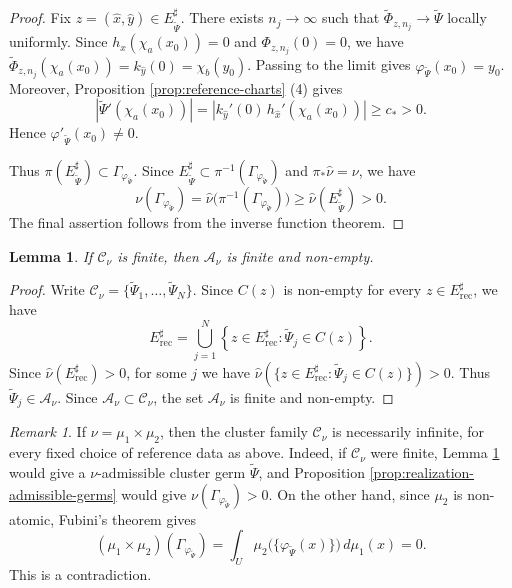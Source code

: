 \documentclass[11pt]{amsart}
\numberwithin{equation}{section}
\theoremstyle{plain}
\newtheorem{lem}[thm]{Lemma}
\theoremstyle{definition}
\theoremstyle{remark}
\newtheorem{rmk}[thm]{Remark}
\begin{document}
\begin{proof}
Fix
$z=(\hat x,\hat y)\in E^\sharp_{\widetilde\Psi}$.
There exists $n_j\to\infty$ such that
$
\widetilde\Phi_{z,n_j}
\to
\widetilde\Psi
$
locally uniformly.
Since
$h_{\hat x}(
\chi_a
(x_0))=0$
and
$\Phi_{z,n_j}(0)=0$, we have
$
\widetilde\Phi_{z,n_j}(
\chi_a(x_0))
=
k_{\hat y}(0)
=
\chi_b(y_0)$.
Passing to the limit gives
$
\varphi_{\widetilde\Psi}(x_0)=y_0$.
Moreover, Proposition \ref{prop:reference-charts} (4) gives
$$
\left|
\widetilde\Psi'(
\chi_a
(x_0))
\right|
=
\left|
k_{\hat y}'(0)\,
h_{\hat x}'(
\chi_a(x_0))
\right|
\geq c_*>0.
$$
Hence
$\varphi'_{\widetilde\Psi}(x_0)\neq0$.

Thus
$\pi(E^\sharp_{\widetilde\Psi})
\subset\Gamma_{\varphi_{\widetilde\Psi}}$.
Since
$E^\sharp_{\widetilde\Psi}
\subset
\pi^{-1}(\Gamma_{\varphi_{\widetilde\Psi}})$
and $\pi_*\hat\nu=\nu$, we have
$$
\nu(\Gamma_{\varphi_{\widetilde\Psi}})
=
\hat\nu\bigl(
\pi^{-1}(\Gamma_{\varphi_{\widetilde\Psi}})
\bigr)
\geq
\hat\nu(E^\sharp_{\widetilde\Psi})
>0.
$$
The final assertion follows from the inverse function theorem.
\end{proof}

\begin{lem}\label{lem:Cnu-finite-admissible}
If $\mathcal C_\nu$ is finite, then
$\mathcal A_\nu$ is finite and non-empty.
\end{lem}

\begin{proof}
Write
$
\mathcal C_\nu
=
\{
\widetilde\Psi_1,\ldots,\widetilde\Psi_N
\}.
$
Since $C(z)$ is non-empty for every
$z\in E^\sharp_{\mathrm{rec}}$, we have
$$
E^\sharp_{\mathrm{rec}}
=
\bigcup_{j=1}^N
\left\{
z\in E^\sharp_{\mathrm{rec}}:
\widetilde\Psi_j\in C(z)
\right\}.
$$
Since $\hat \nu (E^\sharp_{\mathrm{rec}})>0$,
for
some $j$
we have
$\hat\nu
( \{
z\in E^\sharp_{\mathrm{rec}}:
\widetilde\Psi_j\in C(z)
\})
>0$.
Thus
$\widetilde\Psi_j\in\mathcal A_\nu$.
Since
$\mathcal A_\nu\subset\mathcal C_\nu$, the set
$\mathcal A_\nu$ is finite and non-empty.
\end{proof}

\begin{rmk}\label{rmk-Cnu-finite-product}
If $\nu=\mu_1\times\mu_2$, then the cluster family
$\mathcal C_\nu$ is necessarily infinite, for every fixed choice of
reference data as above. Indeed, if $\mathcal C_\nu$ were finite,
Lemma
\ref{lem:Cnu-finite-admissible}
would give a $\nu$-admissible cluster germ
$\widetilde\Psi$, and Proposition
\ref{prop:realization-admissible-germs} would give
$\nu(\Gamma_{\varphi_{\widetilde\Psi}})>0$.
On the other hand, since $\mu_2$ is non-atomic, Fubini's theorem
gives 
$$
(\mu_1\times\mu_2)(\Gamma_{\varphi_{\widetilde\Psi}})
=
\int_U
\mu_2\bigl(\{\varphi_{\widetilde\Psi}(x)\}\bigr)\,d\mu_1(x)
=0.
$$
This is a contradiction.
\end{rmk}
\end{document}
